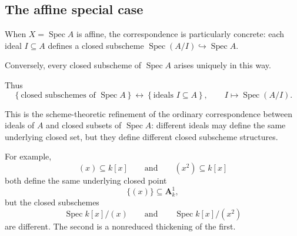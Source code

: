 \subsection{The affine special case}

When \(X=\operatorname{Spec}A\) is affine, the correspondence is
particularly concrete: each ideal \(I\subseteq A\) defines a closed
subscheme \(\operatorname{Spec}(A/I)\hookrightarrow\operatorname{Spec}A\).

Conversely, every closed subscheme of \(\operatorname{Spec} A\) arises uniquely in this way.

Thus
\[
\boxed{
	\left\{
	\text{closed subschemes of }\operatorname{Spec} A
	\right\}
	\longleftrightarrow
	\left\{
	\text{ideals }I\subseteq A
	\right\},
	\qquad
	I\longmapsto \operatorname{Spec}(A/I).
}
\]

This is the scheme-theoretic refinement of the ordinary correspondence between ideals of \(A\) and closed subsets of \(\operatorname{Spec} A\): different ideals may define the same underlying closed set, but they define different closed subscheme structures.

For example,
\[
(x)\subseteq k[x]
\qquad\text{and}\qquad
(x^2)\subseteq k[x]
\]
both define the same underlying closed point
\[
\{(x)\}\subseteq \mathbf{A}^1_k,
\]
but the closed subschemes
\[
\operatorname{Spec} k[x]/(x)
\qquad\text{and}\qquad
\operatorname{Spec} k[x]/(x^2)
\]
are different. The second is a nonreduced thickening of the first.



